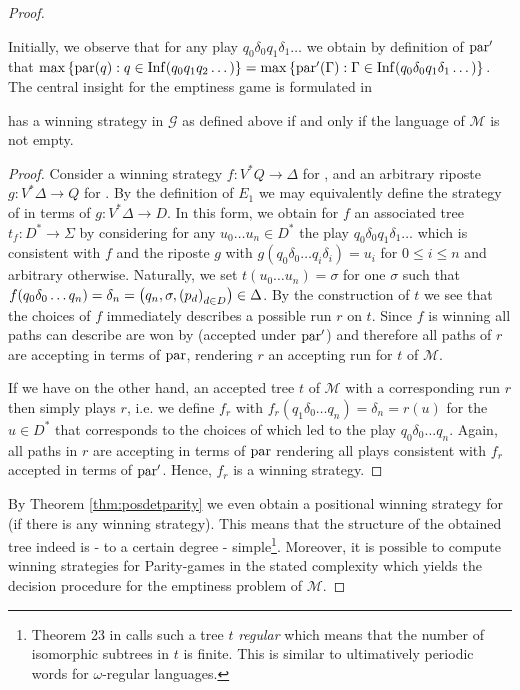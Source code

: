 \begin{proof}
\begin{definition}
  \end{definition}
  Initially, we observe that for any play 
  $q_{0}\delta_{0}q_{1}\delta_{1}\dots$ we obtain by definition of $\operatorname{par}'$
  that $\max\left\{\operatorname{par}(q):q\in\operatorname{Inf}(q_{0}q_{1}q_{2}\dots)\right\} = 
  \max\left\{\operatorname{par}'(\Gamma):\Gamma\in\operatorname{Inf}(
  q_{0}\delta_{0}q_{1}\delta_{1}\dots)\right\}$. The central insight for the emptiness 
  game is formulated in
  \begin{lemma}
    \eve{} has a winning strategy in $\mathcal{G}$ as defined above
    if and only if the language of $\mathcal{M}$ is not empty.
  \end{lemma}
  \begin{proof}
    Consider a winning strategy $f:V^{*}Q\rightarrow\Delta$ for \eve{},
    and an arbitrary riposte $g:V^{*}\Delta\rightarrow Q$ for \adam{}. By
    the definition of $E_{1}$ we may equivalently define the strategy of 
    \adam{} in terms of $g:V^{*}\Delta\rightarrow D$. In this form, we 
    obtain for $f$ an associated tree $t_{f}:D^{*}\rightarrow\Sigma$ by
    considering for any $u_{0}\dots u_{n}\in D^{*}$ the play 
    $q_{0}\delta_{0}q_{1}\delta_{1}\dots$ which is consistent with $f$ and the
    riposte $g$ with $g(q_{0}\delta_{0}\dots q_{i}\delta_{i}) = u_{i}$ for 
    $0\leq i\leq n$ and arbitrary otherwise. Naturally, we set 
    $t(u_{0}\dots u_{n}) = \sigma$ for one $\sigma$ such that 
    $f(q_{0}\delta_{0}\dots q_{n}) = \delta_{n} 
      = \left(q_{n}, \sigma, \left(p_{d}\right)_{d\in D}\right)\in\Delta$. By the 
    construction of $t$ we see that the choices of $f$ immediately describes a 
    possible run $r$ on $t$. Since $f$ is winning all paths \adam{} can
    describe are won by \eve{} (accepted under $\operatorname{par}'$) and therefore 
    all paths of $r$ are accepting in terms of $\operatorname{par}$, rendering $r$ an
    accepting run for $t$ of $\mathcal{M}$.

    If we have on the other hand, an accepted tree $t$ of $\mathcal{M}$ with
    a corresponding run $r$ then \eve{} simply plays $r$, i.e. we define
    $f_{r}$ with $f_{r}(q_{1}\delta_{0}\dots q_{n}) = \delta_{n} = r(u)$ for 
    the $u\in D^{*}$ that corresponds to the choices of \adam{} which led 
    to the play $q_{0}\delta_{0}\dots q_{n}$. Again, all paths in $r$ are 
    accepting in terms of $\operatorname{par}$ rendering all plays consistent with $f_{r}$ 
    accepted in terms of $\operatorname{par}'$. Hence, $f_{r}$ is a winning strategy.
  \end{proof}
  By Theorem \ref{thm:posdetparity} we even obtain a positional winning 
  strategy for \eve{} (if there is any winning strategy). This means that
  the structure of the obtained tree indeed is - to a certain degree - 
  simple\footnote{
    Theorem 23 in \cite{ParityGamesPosDet} calls such a tree $t$ \emph{regular} 
    which means that the number of isomorphic subtrees in $t$ is finite. This
    is similar to ultimatively periodic words for $\omega$-regular languages.
  }. 
  Moreover, it is possible to compute winning strategies for Parity-games in
  the stated complexity which yields the decision procedure for the emptiness 
  problem of $\mathcal{M}$.
\end{proof}
